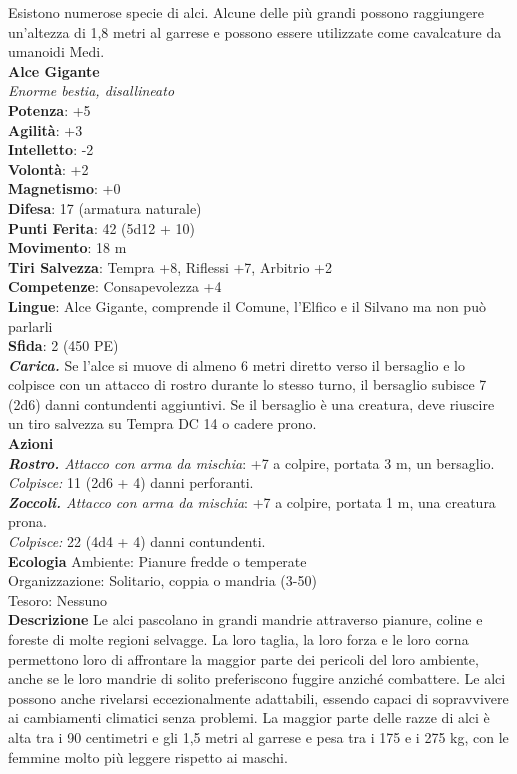 \begin{multicols}{2}
Esistono numerose specie di alci. Alcune delle più grandi possono raggiungere un'altezza di 1,8 metri al garrese e possono essere utilizzate come cavalcature da umanoidi Medi.\\

\medskip\textbf{Alce Gigante}\\
\emph{Enorme bestia, disallineato}\\
\textbf{Potenza}: +5\\
\textbf{Agilità}: +3\\
\textbf{Intelletto}: -2\\
\textbf{Volontà}: +2\\
\textbf{Magnetismo}: +0\\
\textbf{Difesa}: 17 (armatura naturale)\\
\textbf{Punti Ferita}: 42 (5d12 + 10)\\
\textbf{Movimento}: 18 m\\
\textbf{Tiri Salvezza}:  Tempra +8, Riflessi +7, Arbitrio +2\\
\textbf{Competenze}: Consapevolezza +4\\
\textbf{Lingue}: Alce Gigante, comprende il Comune, l'Elfico e il Silvano ma non può parlarli\\
\textbf{Sfida}: 2 (450 PE)\smallskip\\
\emph{\textbf{Carica.}} Se l'alce si muove di almeno 6 metri diretto verso il bersaglio e lo colpisce con un attacco di rostro durante lo stesso turno, il bersaglio subisce 7 (2d6) danni contundenti aggiuntivi. Se il bersaglio è una creatura, deve riuscire un tiro salvezza su Tempra DC 14 o cadere prono.\\
\smallskip\textbf{Azioni}\\
\emph{\textbf{Rostro.} Attacco con arma da mischia}: +7 a colpire, portata 3 m, un bersaglio.\\
\emph{Colpisce:} 11 (2d6 + 4) danni perforanti.\\
\emph{\textbf{Zoccoli.} Attacco con arma da mischia}: +7 a colpire, portata 1 m, una creatura prona.\\
\emph{Colpisce:} 22 (4d4 + 4) danni contundenti.\\
\textbf{Ecologia}
Ambiente: Pianure fredde o temperate\\
Organizzazione: Solitario, coppia o mandria (3-50)\\
Tesoro: Nessuno\\
\textbf{Descrizione}
Le alci pascolano in grandi mandrie attraverso pianure, coline e foreste di molte regioni selvagge. La loro taglia, la loro forza e le loro corna permettono loro di affrontare la maggior parte dei pericoli del loro ambiente, anche se le loro mandrie di solito preferiscono fuggire anziché combattere. Le alci possono anche rivelarsi eccezionalmente adattabili, essendo capaci di sopravvivere ai cambiamenti climatici senza problemi. La maggior parte delle razze di alci è alta tra i 90 centimetri e gli 1,5 metri al garrese e pesa tra i 175 e i 275 kg, con le femmine molto più leggere rispetto ai maschi.\\

\end{multicols}
